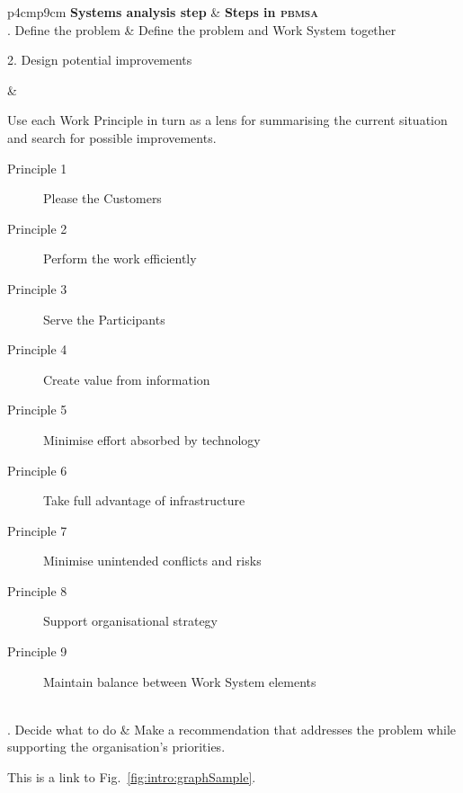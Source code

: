 \begin{table}[ht]
	\caption[Principle-Based Method of Systems Analysis]{Principle-Based Method of Systems Analysis Method \emph{\protect\cite{Alter2002}}} \label{tab:pbmsa}
	\centering\RaggedRight
	\begin{tabular}[t]{p{4cm}p{9cm}}
	\toprule
	\textbf{Systems analysis step} & \textbf{Steps in \textsc{pbmsa}} \\
	. Define the problem & Define the problem and Work System together \\
	\hline
	\parbox[t]{\linewidth}{2. Design potential improvements} & \parbox[t]{\linewidth}{Use each Work Principle in turn as a lens for summarising the current situation and search for possible improvements. 
	\begin{description} 
	\item[Principle 1] Please the Customers
	\item[Principle 2] Perform the work efficiently
	\item[Principle 3] Serve the Participants
	\item[Principle 4] Create value from information
	\item[Principle 5] Minimise effort absorbed by technology
	\item[Principle 6] Take full advantage of infrastructure
	\item[Principle 7] Minimise unintended conflicts and risks
	\item[Principle 8] Support organisational strategy
	\item[Principle 9] Maintain balance between Work System elements
	\end{description}}\\ 
	. Decide what to do & Make a recommendation that addresses the problem while supporting the organisation's priorities. \\
	\bottomrule
	\end{tabular}
\end{table}

This is a link to Fig.~\vref{fig:intro:graphSample}.

